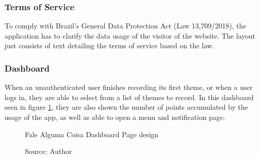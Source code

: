 \subsubsection{Terms of Service}

To comply with Brazil's General Data Protection Act (Law 13,709/2018), the application has to clarify the data usage of the visitor of the website. The layout just consists of text detailing the terms of service based on the law.

\subsubsection{Dashboard}

When an unauthenticated user finishes recording its first theme, or when a user logs in, they are able to select from a list of themes to record. In this dashboard seen in figure \ref{fig:falealgumacoisa-dashboard-page-design}, they are also shown the number of points accumulated by the usage of the app, as well as able to open a menu and notification page.

\begin{figure}[ht]
    \centering
    \caption{Fale Alguma Coisa Dashboard Page design}
    \caption*{Source: Author}
    \label{fig:falealgumacoisa-dashboard-page-design}
\end{figure}

